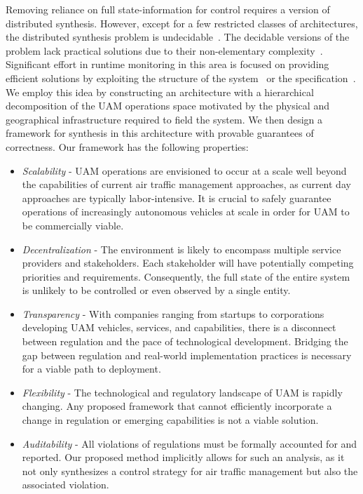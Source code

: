 Removing reliance on full state-information for control requires a version of distributed synthesis. However, except for a few restricted classes of architectures, the distributed synthesis problem is undecidable~\cite{SCHEWE2014203}. The decidable versions of the problem lack practical solutions due to their non-elementary complexity~\cite{Schewe08}. Significant effort in runtime monitoring in this area is focused on providing efficient solutions by exploiting  the structure of the system~\cite{FalconeJNBB15,CassarF16} or the specification~\cite{FrancalanzaS15,BauerF16}.  We employ this idea by constructing an architecture with a hierarchical decomposition of the UAM operations space motivated by the physical and geographical infrastructure required to field the system. We then design a framework for synthesis in this architecture with provable guarantees of correctness. Our framework has the following properties:


\begin{itemize}
	\item \emph{Scalability} - UAM operations are envisioned to occur at a scale well beyond the capabilities of current air traffic management approaches, as current day approaches are typically labor-intensive. It is crucial to safely guarantee operations of increasingly autonomous vehicles at scale in order for UAM to be commercially viable. 
	
	\item \emph{Decentralization} - The environment is likely to encompass multiple service providers and stakeholders. Each stakeholder will have potentially competing priorities and requirements. Consequently, the full state of the entire system is unlikely to be controlled or even observed by a single entity.
	
	\item \emph{Transparency} - With companies ranging from startups to corporations developing UAM vehicles, services, and capabilities, there is a disconnect between regulation and the pace of technological development. Bridging the gap between regulation and real-world implementation practices is necessary for a viable path to deployment. 
	
	\item \emph{Flexibility} - The technological and regulatory landscape of UAM is rapidly changing. Any proposed framework that cannot efficiently incorporate a change in regulation or emerging capabilities is not a viable solution. 
	
	\item \emph{Auditability} - All violations of regulations must be formally accounted for and reported. Our proposed method implicitly allows for such an analysis, as it not only synthesizes a control strategy for air traffic management but also the associated violation. 
\end{itemize}

